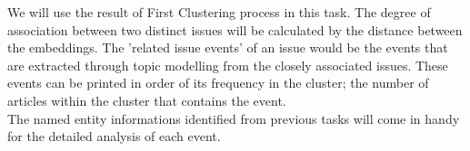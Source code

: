  We will use the result of First Clustering process in this task. The degree of association between two distinct issues will be calculated by the distance between the embeddings. The 'related issue events' of an issue would be the events that are extracted through topic modelling from the closely associated issues. These events can be printed in order of its frequency in the cluster; the number of articles within the cluster that contains the event.\\
 The named entity informations identified from previous tasks will come in handy for the detailed analysis of each event. 